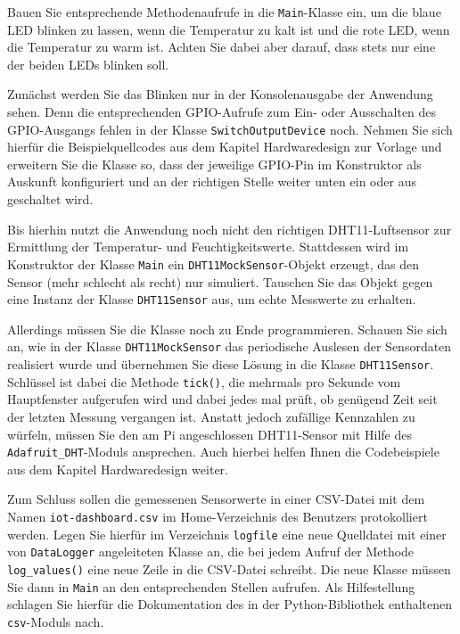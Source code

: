Bauen Sie entsprechende Methodenaufrufe in die \texttt{Main}-Klasse ein, um
die blaue LED blinken zu lassen, wenn die Temperatur zu kalt ist und die rote
LED, wenn die Temperatur zu warm ist. Achten Sie dabei aber darauf, dass stets
nur eine der beiden LEDs blinken soll.

Zunächst werden Sie das Blinken nur in der Konsolenausgabe der Anwendung sehen.
Denn die entsprechenden GPIO-Aufrufe zum Ein- oder Ausschalten des GPIO-Ausgangs
fehlen in der Klasse \texttt{Switch\-Output\-Device} noch. Nehmen Sie sich
hierfür die Beispielquellcodes aus dem Kapitel \glqq{}Hardwaredesign\grqq{}
zur Vorlage und erweitern Sie die Klasse so, dass der jeweilige GPIO-Pin im
Konstruktor als Auskunft konfiguriert und an der richtigen Stelle weiter unten
ein oder aus geschaltet wird.

\bigskip
\teilaufgabe
Bis hierhin nutzt die Anwendung noch nicht den richtigen DHT11-Luftsensor zur
Ermittlung der Temperatur- und Feuchtigkeitswerte. Stattdessen wird im Konstruktor
der Klasse \texttt{Main} ein \texttt{DHT11\-Mock\-Sensor}-Objekt erzeugt, das den
Sensor (mehr schlecht als recht) nur simuliert. Tauschen Sie das Objekt gegen eine
Instanz der Klasse \texttt{DHT11\-Sensor} aus, um echte Messwerte zu erhalten.

Allerdings müssen Sie die Klasse noch zu Ende programmieren. Schauen Sie sich an,
wie in der Klasse \texttt{DHT11\-Mock\-Sensor} das periodische \glqq{}Auslesen\grqq{}
der Sensordaten realisiert wurde und übernehmen Sie diese Lösung in die Klasse
\texttt{DHT11\-Sensor}. Schlüssel ist dabei die Methode \texttt{tick()}, die
mehrmals pro Sekunde vom Hauptfenster aufgerufen wird und dabei jedes mal prüft,
ob genügend Zeit seit der letzten Messung vergangen ist. Anstatt jedoch zufällige
Kennzahlen zu würfeln, müssen Sie den am Pi angeschlossen DHT11-Sensor mit Hilfe
des \texttt{Adafruit\_\-DHT}-Moduls ansprechen. Auch hierbei helfen Ihnen die
Codebeispiele aus dem Kapitel \glqq{}Hardwaredesign\grqq{} weiter.

\bigskip
\teilaufgabe
Zum Schluss sollen die gemessenen Sensorwerte in einer CSV-Datei mit dem Namen
\texttt{iot\--dashboard.csv} im Home-Verzeichnis des Benutzers protokolliert
werden. Legen Sie hierfür im Verzeichnis \texttt{logfile} eine neue Quelldatei
mit einer von \texttt{Data\-Logger} angeleiteten Klasse an, die bei jedem
Aufruf der Methode \texttt{log\_\-values()} eine neue Zeile in die CSV-Datei
schreibt. Die neue Klasse müssen Sie dann in \texttt{Main} an den entsprechenden
Stellen aufrufen. Als Hilfestellung schlagen Sie hierfür die Dokumentation des
in der Python-Bibliothek enthaltenen \texttt{csv}-Moduls nach.


